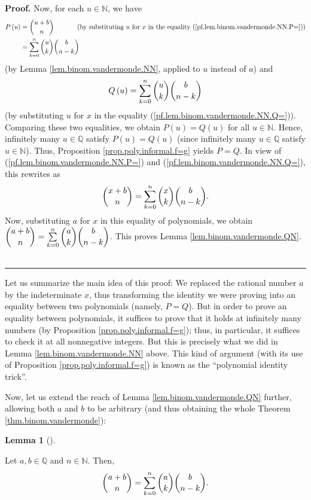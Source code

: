 \documentclass[numbers=enddot,12pt,final,onecolumn,notitlepage]{scrartcl}%
\numberwithin{exer}{subsection}
\theoremstyle{definition}
\newtheorem{lem}[theo]{Lemma}
\newenvironment{lemma}[1][]
{\begin{lem}[#1]\begin{leftbar}}
{\end{leftbar}\end{lem}}
\newenvironment{proof}[1][Proof]{\noindent\textbf{#1.} }{\ \rule{0.5em}{0.5em}}
\let\sumnonlimits\sum
\renewcommand{\sum}{\sumnonlimits\limits}
\begin{document}
\begin{proof}
Now, for each $u\in\mathbb{N}$, we have%
\begin{align*}
P\left(  u\right)   &  =\dbinom{u+b}{n}\ \ \ \ \ \ \ \ \ \ \left(  \text{by
substituting }u\text{ for }x\text{ in the equality
(\ref{pf.lem.binom.vandermonde.NN.P=})}\right) \\
&  =\sum_{k=0}^{n}\dbinom{u}{k}\dbinom{b}{n-k}%
\end{align*}
(by Lemma \ref{lem.binom.vandermonde.NN}, applied to $u$ instead of $a$) and%
\[
Q\left(  u\right)  =\sum_{k=0}^{n}\dbinom{u}{k}\dbinom{b}{n-k}%
\]
(by substituting $u$ for $x$ in the equality
(\ref{pf.lem.binom.vandermonde.NN.Q=})). Comparing these two equalities, we
obtain $P\left(  u\right)  =Q\left(  u\right)  $ for all $u\in\mathbb{N}$.
Hence, infinitely many $u\in\mathbb{Q}$ satisfy $P\left(  u\right)  =Q\left(
u\right)  $ (since infinitely many $u\in\mathbb{Q}$ satisfy $u\in\mathbb{N}$).
Thus, Proposition \ref{prop.poly.informal.f=g} yields $P=Q$. In view of
(\ref{pf.lem.binom.vandermonde.NN.P=}) and
(\ref{pf.lem.binom.vandermonde.NN.Q=}), this rewrites as%
\begin{equation}
\dbinom{x+b}{n}=\sum_{k=0}^{n}\dbinom{x}{k}\dbinom{b}{n-k}.
\label{pf.lem.binom.vandermonde.NN.final}%
\end{equation}
Now, substituting $a$ for $x$ in this equality of polynomials, we obtain
$\dbinom{a+b}{n}=\sum_{k=0}^{n}\dbinom{a}{k}\dbinom{b}{n-k}$. This proves
Lemma \ref{lem.binom.vandermonde.QN}.
\end{proof}

Let us summarize the main idea of this proof: We replaced the rational number
$a$ by the indeterminate $x$, thus transforming the identity we were proving
into an equality between two polynomials (namely, $P=Q$). But in order to
prove an equality between polynomials, it suffices to prove that it holds at
infinitely many numbers (by Proposition \ref{prop.poly.informal.f=g}); thus,
in particular, it suffices to check it at all nonnegative integers. But this
is precisely what we did in Lemma \ref{lem.binom.vandermonde.NN} above. This
kind of argument (with its use of Proposition \ref{prop.poly.informal.f=g}) is
known as the \textquotedblleft polynomial identity trick\textquotedblright.

Now, let us extend the reach of Lemma \ref{lem.binom.vandermonde.QN} further,
allowing both $a$ and $b$ to be arbitrary (and thus obtaining the whole
Theorem \ref{thm.binom.vandermonde}):

\begin{lemma}
\label{lem.binom.vandermonde.QQ}Let $a,b\in\mathbb{Q}$ and $n\in\mathbb{N}$.
Then,%
\[
\dbinom{a+b}{n}=\sum_{k=0}^{n}\dbinom{a}{k}\dbinom{b}{n-k}.
\]

\end{lemma}
\end{document}
